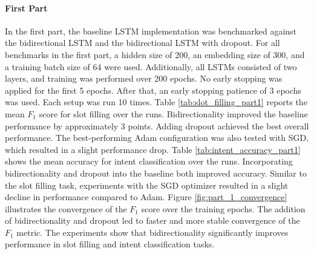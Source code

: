 \documentclass[a4paper]{article}
\begin{document}
\paragraph*{First Part}
In the first part, the baseline LSTM implementation was benchmarked against the bidirectional LSTM and the bidirectional LSTM with dropout. For all benchmarks in the first part, a hidden size of 200, an embedding size of 300, and a training batch size of 64 were used. Additionally, all LSTMs consisted of two layers, and training was performed over 200 epochs. No early stopping was applied for the first 5 epochs. After that, an early stopping patience of 3 epochs was used. Each setup was run 10 times. Table \ref{tab:slot_filling_part1} reports the mean $F_1$ score for slot filling over the runs. Bidirectionality improved the baseline performance by approximately 3 points. Adding dropout achieved the best overall performance. The best-performing Adam configuration was also tested with SGD, which resulted in a slight performance drop. Table \ref{tab:intent_accuracy_part1} shows the mean accuracy for intent classification over the runs. Incorporating bidirectionality and dropout into the baseline both improved accuracy. Similar to the slot filling task, experiments with the SGD optimizer resulted in a slight decline in performance compared to Adam. Figure \ref{fig:part_1_convergence} illustrates the convergence of the $F_1$ score over the training epochs. The addition of bidirectionality and dropout led to faster and more stable convergence of the $F_1$ metric. 
The experiments show that bidirectionality significantly improves performance in slot filling and intent classification tasks. 
\end{document}
